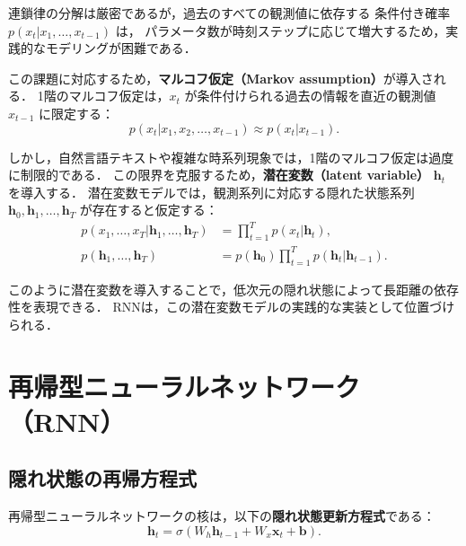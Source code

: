 連鎖律の分解は厳密であるが，過去のすべての観測値に依存する
条件付き確率 $p(x_t | x_1, \ldots, x_{t-1})$ は，
パラメータ数が時刻ステップに応じて増大するため，実践的なモデリングが困難である．

この課題に対応するため，\textbf{マルコフ仮定（Markov assumption）}が導入される．
1階のマルコフ仮定は，$x_t$ が条件付けられる過去の情報を直近の観測値 $x_{t-1}$ に限定する：
\begin{equation}
  p(x_t | x_1, x_2, \ldots, x_{t-1}) \approx p(x_t | x_{t-1}).
  \label{eq:markov}
\end{equation}

しかし，自然言語テキストや複雑な時系列現象では，1階のマルコフ仮定は過度に制限的である．
この限界を克服するため，\textbf{潜在変数（latent variable）} $\boldsymbol{h}_t$ を導入する．
潜在変数モデルでは，観測系列に対応する隠れた状態系列
$\boldsymbol{h}_0, \boldsymbol{h}_1, \ldots, \boldsymbol{h}_T$ が存在すると仮定する：
\begin{align}
  p(x_1, \ldots, x_T | \boldsymbol{h}_1, \ldots, \boldsymbol{h}_T) &= \prod_{t=1}^{T} p(x_t | \boldsymbol{h}_t), \\
  p(\boldsymbol{h}_1, \ldots, \boldsymbol{h}_T) &= p(\boldsymbol{h}_0) \prod_{t=1}^{T} p(\boldsymbol{h}_t | \boldsymbol{h}_{t-1}).
\end{align}

このように潜在変数を導入することで，低次元の隠れ状態によって長距離の依存性を表現できる．
RNNは，この潜在変数モデルの実践的な実装として位置づけられる．

\section{再帰型ニューラルネットワーク（RNN）}
\label{sec:rnn}

\subsection{隠れ状態の再帰方程式}

再帰型ニューラルネットワークの核は，以下の\textbf{隠れ状態更新方程式}である：
\begin{equation}
  \boldsymbol{h}_t = \sigma(W_h \boldsymbol{h}_{t-1} + W_x \boldsymbol{x}_t + \boldsymbol{b}).
  \label{eq:rnn-update}
\end{equation}

